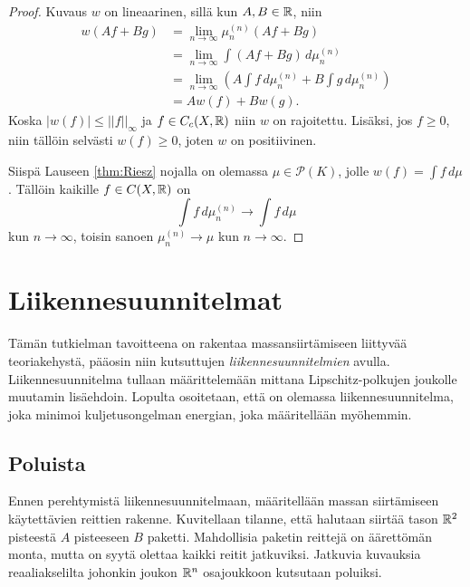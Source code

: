 \documentclass[12pt,oneside,a4paper]{amsbook} %
\begin{document}
\begin{proof}
    Kuvaus $w$ on lineaarinen, sillä kun $A, B \in \mathbb{R}$, niin
    \begin{align*}
        w(A f + B g) &= \lim_{n \to \infty} \mu_n^{(n)}(A f + B g) \\
        &=\lim_{n \to \infty} \int (A f + B g) \, d\mu_n^{(n)} \\
        &=\lim_{n \to \infty}  \left(A \int f \, d\mu_n^{(n)} + B \int g \, d\mu_n^{(n)}\right)  \\
        &= A w(f) + B w(g).
    \end{align*}
    Koska $|w(f)| \le ||f||_\infty$ ja $f \in C_c(X, \mathbb{R})$ niin $w$ on rajoitettu. Lisäksi, jos $f \ge 0$, niin tällöin selvästi $w(f) \ge 0$, joten $w$ on positiivinen.


    Siispä Lauseen \ref{thm:Riesz} nojalla on olemassa $\mu \in \mathcal P(K)$, jolle $w(f) = \int f \, d\mu$. Tällöin kaikille $f \in C(X, \mathbb{R})$ on
    \begin{equation*}
        \int f \, d\mu_n^{(n)} \to \int f \, d\mu
    \end{equation*}
    kun $n \to \infty$, toisin sanoen $\mu_n^{(n)} \to \mu$ kun $n \to \infty$.
\end{proof}

\chapter{Liikennesuunnitelmat}

Tämän tutkielman tavoitteena on rakentaa massansiirtämiseen liittyvää teoriakehystä, pääosin niin kutsuttujen \textit{liikennesuunnitelmien} avulla. Liikennesuunnitelma tullaan määrittelemään mittana Lipschitz-polkujen joukolle muutamin lisäehdoin. Lopulta osoitetaan, että on olemassa liikennesuunnitelma, joka minimoi kuljetusongelman energian, joka määritellään myöhemmin. 

\section{Poluista}
Ennen perehtymistä liikennesuunnitelmaan, määritellään massan siirtämiseen käytettävien reittien rakenne. Kuvitellaan tilanne, että halutaan siirtää tason $\mathbb{R}^2$ pisteestä $A$ pisteeseen $B$ paketti. Mahdollisia paketin reittejä on äärettömän monta, mutta on syytä olettaa kaikki reitit jatkuviksi. Jatkuvia kuvauksia reaaliakselilta johonkin joukon $\mathbb{R}^n$ osajoukkoon kutsutaan poluiksi. 
\end{document}
